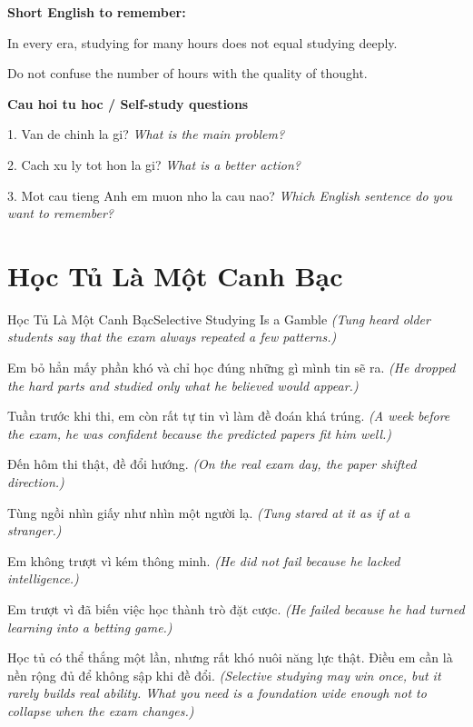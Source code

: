\begin{ghinhoanh}
\textbf{Short English to remember:}

In every era, studying for many hours does not equal studying deeply.

Do not confuse the number of hours with the quality of thought.

\end{ghinhoanh}

\begin{tuhocnhanh}
\textbf{Cau hoi tu hoc / Self-study questions}

1. Van de chinh la gi? \textit{What is the main problem?}

2. Cach xu ly tot hon la gi? \textit{What is a better action?}

3. Mot cau tieng Anh em muon nho la cau nao? \textit{Which English sentence do you want to remember?}
\end{tuhocnhanh}
\ngancach

\section{Học Tủ Là Một Canh Bạc}
\begin{truyen}{Học Tủ Là Một Canh Bạc}{Selective Studying Is a Gamble}
\textit{(Tung heard older students say that the exam always repeated a few patterns.)}

Em bỏ hẳn mấy phần khó và chỉ học đúng những gì mình tin sẽ ra.
\textit{(He dropped the hard parts and studied only what he believed would appear.)}

Tuần trước khi thi, em còn rất tự tin vì làm đề đoán khá trúng.
\textit{(A week before the exam, he was confident because the predicted papers fit him well.)}

Đến hôm thi thật, đề đổi hướng.
\textit{(On the real exam day, the paper shifted direction.)}

Tùng ngồi nhìn giấy như nhìn một người lạ.
\textit{(Tung stared at it as if at a stranger.)}

Em không trượt vì kém thông minh.
\textit{(He did not fail because he lacked intelligence.)}

Em trượt vì đã biến việc học thành trò đặt cược.
\textit{(He failed because he had turned learning into a betting game.)}

\end{truyen}

\begin{baihoc}
Học tủ có thể thắng một lần, nhưng rất khó nuôi năng lực thật. Điều em cần là nền rộng đủ để không sập khi đề đổi.
\textit{(Selective studying may win once, but it rarely builds real ability. What you need is a foundation wide enough not to collapse when the exam changes.)}
\end{baihoc}

